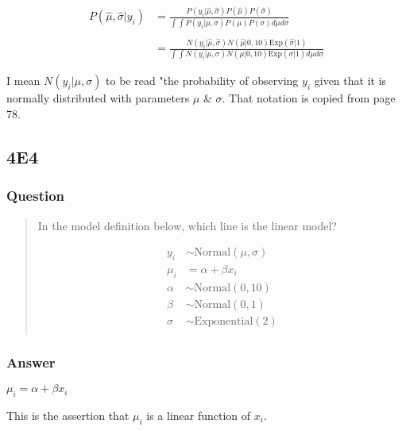 \documentclass[
]{book}
\begin{document}
\[
\begin{aligned}
P(\hat\mu,\hat\sigma | y_i) &= \frac{P(y_i | \hat\mu, \hat\sigma)P(\hat\mu)P(\hat\sigma)}{\int\int P(y_i | \mu, \sigma)P(\mu)P(\sigma) d\mu d\sigma}  \\
\\
                    &= \frac{N(y_i | \hat\mu, \hat\sigma)N(\hat\mu | 0,10)\text{Exp}(\hat\sigma|1)}{\int\int N(y_i | \mu, \sigma)N(\mu | 0,10)\text{Exp}(\sigma|1) d\mu d\sigma}
\end{aligned}
\]

I mean \(N(y_i | \mu, \sigma)\) to be read "the probability of observing \(y_i\) given that it is normally distributed with parameters \(\mu\) \& \(\sigma\). That notation is copied from page 78.

\hypertarget{e4-2}{%
\subsection*{4E4}\label{e4-2}}

\hypertarget{question-36}{%
\subsubsection*{Question}\label{question-36}}

\begin{quote}
In the model definition below, which line is the linear model?

\[
\begin{aligned}
y_i &\sim \text{Normal}(\mu, \sigma) \\
\mu_i &= \alpha + \beta x_i \\
\alpha &\sim \text{Normal}(0, 10) \\ 
\beta &\sim \text{Normal}(0, 1) \\
\sigma &\sim \text{Exponential}(2) \\
\end{aligned}
\]
\end{quote}

\hypertarget{answer-36}{%
\subsubsection*{Answer}\label{answer-36}}

\(\mu_i = \alpha + \beta x_i\)

This is the assertion that \(\mu_i\) is a linear function of \(x_i\).
\end{document}
